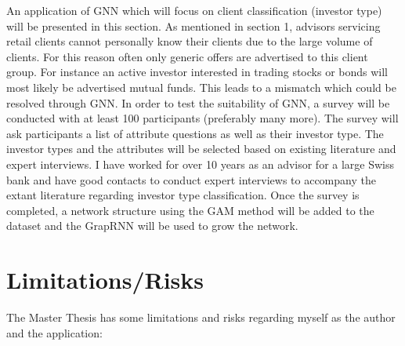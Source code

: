 \documentclass[12pt,a4paper]{article}
\begin{document}
	An application of GNN which will focus on client classification (investor type) will be presented in this section. As mentioned in section 1, 
	advisors servicing retail clients cannot personally know their clients due to the large volume of clients. For this reason often only generic 
	offers are advertised to this client group. For instance an active investor interested in trading stocks or bonds will most likely be advertised 
	mutual funds. This leads to a mismatch which could be resolved through GNN. In order to test the suitability of GNN, a survey will be conducted 
	with at least 100 participants (preferably many more). The survey will ask participants a list of attribute questions as well as their investor 
	type. The investor types and the attributes will be selected based on existing literature and expert interviews. I have worked for over 10 years 
	as an advisor for a large Swiss bank and have good contacts to conduct expert interviews to accompany the extant literature regarding investor 
	type classification. Once the survey is completed, a network structure using the GAM method will be added to the dataset and the GrapRNN will be 
	used to grow the network. 

	\section{Limitations/Risks}

	The Master Thesis has some limitations and risks regarding myself as the author and the application:
\end{document}
